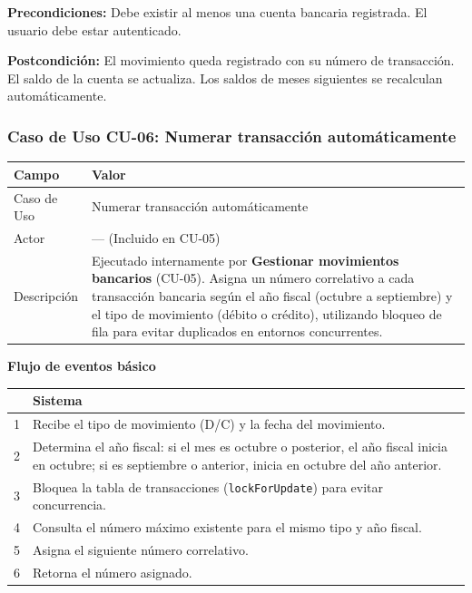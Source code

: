 \documentclass[stu]{apa7}
\begin{document}
\textbf{Precondiciones:} Debe existir al menos una cuenta bancaria registrada. El usuario debe estar autenticado.

\textbf{Postcondición:} El movimiento queda registrado con su número de transacción. El saldo de la cuenta se actualiza. Los saldos de meses siguientes se recalculan automáticamente.

\newpage

\subsubsection{Caso de Uso CU-06: Numerar transacción automáticamente}

\begin{tabularx}{\textwidth}{|l|X|}
\hline
\rowcolor[gray]{0.9}
\textbf{Campo} & \textbf{Valor} \\
\hline
Caso de Uso & Numerar transacción automáticamente \\
\hline
Actor & --- (Incluido en CU-05) \\
\hline
Descripción & Ejecutado internamente por \textbf{Gestionar movimientos bancarios} (CU-05). Asigna un número correlativo a cada transacción bancaria según el año fiscal (octubre a septiembre) y el tipo de movimiento (débito o crédito), utilizando bloqueo de fila para evitar duplicados en entornos concurrentes. \\
\hline
\end{tabularx}

\vspace{0.3cm}

\textbf{Flujo de eventos básico}

\begin{tabularx}{\textwidth}{|c|X|}
\hline
& \textbf{Sistema} \\
\hline
1 & Recibe el tipo de movimiento (D/C) y la fecha del movimiento. \\
\hline
2 & Determina el año fiscal: si el mes es octubre o posterior, el año fiscal inicia en octubre; si es septiembre o anterior, inicia en octubre del año anterior. \\
\hline
3 & Bloquea la tabla de transacciones (\texttt{lockForUpdate}) para evitar concurrencia. \\
\hline
4 & Consulta el número máximo existente para el mismo tipo y año fiscal. \\
\hline
5 & Asigna el siguiente número correlativo. \\
\hline
6 & Retorna el número asignado. \\
\hline
\end{tabularx}
\end{document}
